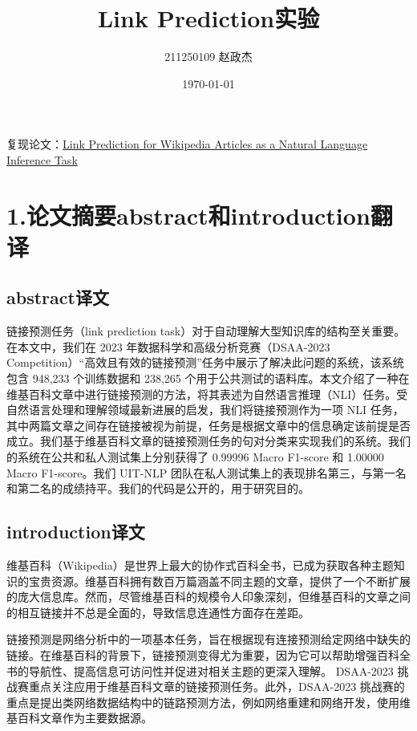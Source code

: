 \documentclass[
]{article}
\author{}
\date{}
\begin{document}
\title{Link Prediction实验}
\author{211250109 赵政杰}
\date{\today}
\maketitle
复现论文：\href{https://arxiv.org/pdf/2308.16469v2.pdf}{Link Prediction for Wikipedia Articles as a Natural Language Inference Task}
\section{1.论文摘要abstract和introduction翻译}\label{1ux8bbaux6587ux6458ux8981abstractux548cintroductionux7ffbux8bd1}

\subsection{abstract译文}\label{abstractux8bd1ux6587}

链接预测任务（link prediction task）对于自动理解大型知识库的结构至关重要。在本文中，我们在 2023
年数据科学和高级分析竞赛（DSAA-2023 Competition）“高效且有效的链接预测”任务中展示了解决此问题的系统，该系统包含
948,233 个训练数据和 238,265 个用于公共测试的语料库。本文介绍了一种在维基百科文章中进行链接预测的方法，将其表述为自然语言推理（NLI）任务。受自然语言处理和理解领域最新进展的启发，我们将链接预测作为一项
NLI 任务，其中两篇文章之间存在链接被视为前提，任务是根据文章中的信息确定该前提是否成立。我们基于维基百科文章的链接预测任务的句对分类来实现我们的系统。我们的系统在公共和私人测试集上分别获得了
0.99996 Macro F1-score 和 1.00000 Macro F1-score。我们 UIT-NLP 团队在私人测试集上的表现排名第三，与第一名和第二名的成绩持平。我们的代码是公开的，用于研究目的。

\subsection{introduction译文}\label{introductionux8bd1ux6587}

维基百科（Wikipedia）是世界上最大的协作式百科全书，已成为获取各种主题知识的宝贵资源。维基百科拥有数百万篇涵盖不同主题的文章，提供了一个不断扩展的庞大信息库。然而，尽管维基百科的规模令人印象深刻，但维基百科的文章之间的相互链接并不总是全面的，导致信息连通性方面存在差距。

链接预测是网络分析中的一项基本任务，旨在根据现有连接预测给定网络中缺失的链接。在维基百科的背景下，链接预测变得尤为重要，因为它可以帮助增强百科全书的导航性、提高信息可访问性并促进对相关主题的更深入理解。
DSAA-2023
挑战赛重点关注应用于维基百科文章的链接预测任务。此外，DSAA-2023
挑战赛的重点是提出类网络数据结构中的链路预测方法，例如网络重建和网络开发，使用维基百科文章作为主要数据源。
\end{document}
